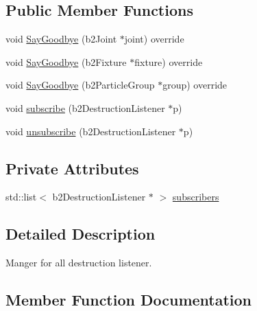 \subsection*{Public Member Functions}
\begin{DoxyCompactItemize}
\item 
void \hyperlink{classWorld_1_1MyDestructionListener_afb69a87d5d2bfea63bb9fed16e6b6677}{Say\+Goodbye} (b2\+Joint $\ast$joint) override
\item 
void \hyperlink{classWorld_1_1MyDestructionListener_abf208c075a30abc88da5d8d91378de9a}{Say\+Goodbye} (b2\+Fixture $\ast$fixture) override
\item 
void \hyperlink{classWorld_1_1MyDestructionListener_a1cabe04394a461a952bbf027157b9628}{Say\+Goodbye} (b2\+Particle\+Group $\ast$group) override
\item 
void \hyperlink{classWorld_1_1MyDestructionListener_ac01b1f54aed1b55c959a2e58f21a0017}{subscribe} (b2\+Destruction\+Listener $\ast$p)
\item 
void \hyperlink{classWorld_1_1MyDestructionListener_a6304a373d6d6119737802b0d3916c977}{unsubscribe} (b2\+Destruction\+Listener $\ast$p)
\end{DoxyCompactItemize}
\subsection*{Private Attributes}
\begin{DoxyCompactItemize}
\item 
std\+::list$<$ b2\+Destruction\+Listener $\ast$ $>$ \hyperlink{classWorld_1_1MyDestructionListener_abae6aedcdb7b1fec3d4bab40621a0619}{subscribers}
\end{DoxyCompactItemize}


\subsection{Detailed Description}
Manger for all destruction listener. 

\subsection{Member Function Documentation}
\hypertarget{classWorld_1_1MyDestructionListener_afb69a87d5d2bfea63bb9fed16e6b6677}{}
